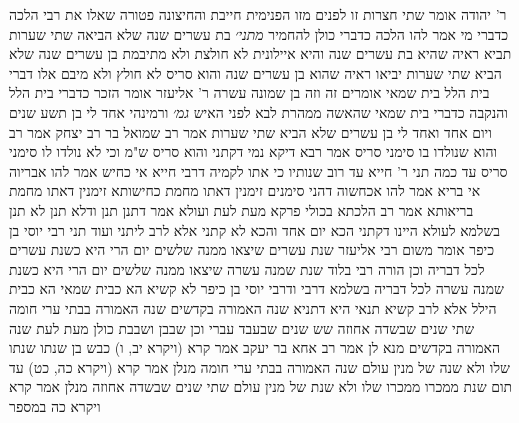 \documentclass[12pt, openany]{book}
\begin{document}
{ר' יהודה אומר  שתי חצרות זו לפנים מזו הפנימית חייבת והחיצונה פטורה 
שאלו את רבי  הלכה כדברי מי  אמר להו  הלכה כדברי כולן להחמיר
{\large\emph{מתני׳}} בת עשרים שנה שלא הביאה שתי שערות תביא ראיה שהיא בת עשרים שנה והיא איילונית לא חולצת ולא מתיבמת
בן עשרים שנה שלא הביא שתי שערות יביאו ראיה שהוא בן עשרים שנה והוא סריס לא חולץ ולא מיבם אלו דברי בית הלל  בית שמאי אומרים  זה וזה בן שמונה עשרה 
ר' אליעזר אומר  הזכר כדברי בית הלל והנקבה כדברי בית שמאי שהאשה ממהרת לבא לפני האיש
{\large\emph{גמ׳}} ורמינהי אחד לי בן תשע שנים ויום אחד ואחד לי בן עשרים שלא הביא שתי שערות 
אמר רב שמואל בר רב יצחק אמר רב  והוא שנולדו בו סימני סריס  אמר רבא  דיקא נמי דקתני והוא סריס ש"מ 
וכי לא נולדו לו סימני סריס עד כמה  תני ר' חייא  עד רוב שנותיו 
כי אתו לקמיה דרבי חייא אי כחיש אמר להו  אבריוה  אי בריא אמר להו  אכחשוה דהני סימנים זימנין דאתו מחמת כחישותא זימנין דאתו מחמת בריאותא 
אמר רב  הלכתא בכולי פרקא מעת לעת  ועולא אמר  דתנן תנן ודלא תנן לא תנן 
בשלמא לעולא היינו דקתני הכא יום אחד והכא לא קתני  אלא לרב ליתני 
ועוד תני רבי יוסי בן כיפר אומר משום רבי אליעזר  שנת עשרים שיצאו ממנה שלשים יום הרי היא כשנת עשרים לכל דבריה  וכן הורה רבי בלוד  שנת שמנה עשרה שיצאו ממנה שלשים יום הרי היא כשנת שמנה עשרה לכל דבריה 
בשלמא דרבי ודרבי יוסי בן כיפר לא קשיא הא כבית שמאי הא כבית הילל אלא לרב קשיא 
תנאי היא דתניא  שנה האמורה בקדשים שנה האמורה בבתי ערי חומה שתי שנים שבשדה אחוזה
שש שנים שבעבד עברי וכן שבבן ושבבת כולן מעת לעת 
שנה האמורה בקדשים מנא לן  אמר רב אחא בר יעקב  אמר קרא (ויקרא יב, ו) כבש בן שנתו שנתו שלו ולא שנה של מנין עולם 
שנה האמורה בבתי ערי חומה מנלן  אמר קרא  (ויקרא כה, כט) עד תום שנת ממכרו ממכרו שלו ולא שנת של מנין עולם  שתי שנים שבשדה אחוזה מנלן  אמר קרא  {ויקרא כה } במספר}
\end{document}
